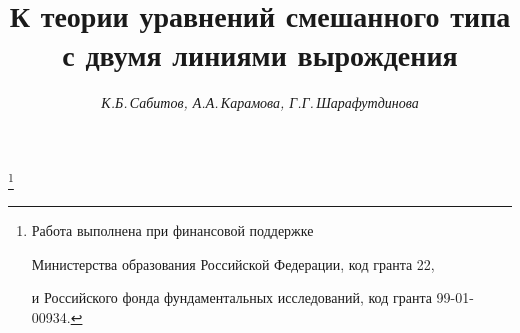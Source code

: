 









\newcommand{\const}{\operatorname{const}}


\newcommand{\sgn}{\operatorname{sgn}}


\newcommand{\tts}[1]{}


\renewcommand{\baselinestretch}{0.95}







\setcounter{page}{70}















\author{\it К.Б.\,Сабитов, А.А.\,Карамова, Г.Г.\,Шарафутдинова}




\title{К теории уравнений смешанного типа\\ с двумя линиями вырождения}


\thanks{Работа выполнена при финансовой поддержке


Министерства образования Российской Федерации, код гранта 22,


и Российского фонда фундаментальных исследований, код гранта 99-01-00934.}





\date{}




